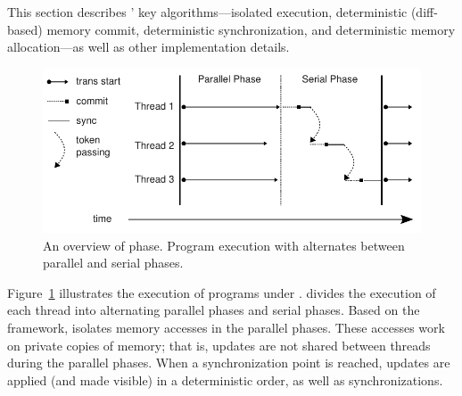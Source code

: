 \label{sec:dthreads-architecture}
This section describes \dthreads{}’ key algorithms---isolated execution, deterministic (diff-based) memory commit, deterministic synchronization, and deterministic memory allocation---as well as other implementation details.

\begin{figure}
{\centering 
\includegraphics[width=6in]{dthreads/figure/phase}
\caption{An overview of \dthreads{} phase. Program execution with \dthreads{} alternates between parallel and serial phases.\label{fig:phase}}
}
\end{figure}

Figure~\ref{fig:phase} illustrates the execution of programs under \dthreads{}. \dthreads{} divides the execution of each thread into alternating parallel phases and serial phases. 
Based on the \sheriff{} framework, \dthreads{} isolates memory accesses in the parallel phases. These accesses work on private copies of memory; that is, updates are not shared between threads during the parallel phases. When a synchronization point is reached, updates are applied (and made visible) in a deterministic order, as well as synchronizations. 
  
